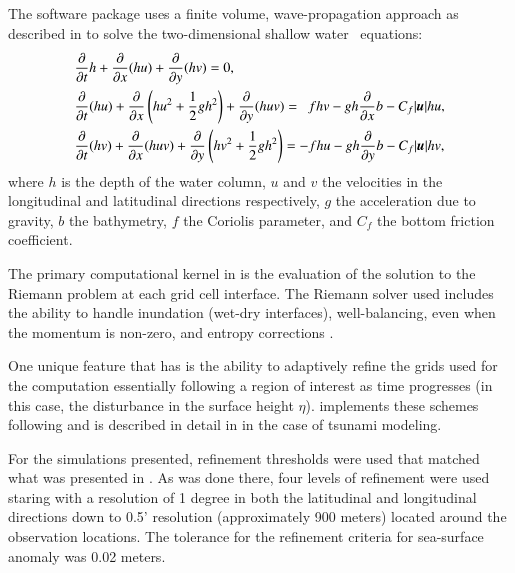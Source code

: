 \subsection{\geoclaw} \label{ssub:geoclaw}
The \geoclaw software package uses a finite volume, wave-propagation approach as
described in \cite{LeVeque:1997eg} to solve the two-dimensional shallow water \
equations:
\begin{equation} \label{eq:swe}
    \begin{aligned}
    &\pd{}{t} h + \pd{}{x} (hu) + \pd{}{y} (hv) = 0, \\
    &\pd{}{t}(hu) + \pd{}{x} \left(hu^2 + \frac{1}{2} g h^2 \right ) + \pd{}{y} (huv) = ~~ fhv - gh \pd{}{x} b - C_f |\vec{u}| hu, \\
    &\pd{}{t} (hv) + \pd{}{x} (huv) + \pd{}{y} \left (hv^2 + \frac{1}{2} gh^2 \right) = -fhu - gh \pd{}{y} b - C_f |\vec{u}| hv,
    \end{aligned}
\end{equation} 
where $h$ is the depth of the water column, $u$ and $v$ the velocities in the 
longitudinal and latitudinal directions respectively, $g$ the acceleration due 
to gravity, $b$ the bathymetry, $f$ the Coriolis parameter, and $C_f$ the bottom 
friction coefficient.  

The primary computational kernel in \geoclaw is the evaluation of the solution
to the Riemann problem at each grid cell interface.  The Riemann solver used
includes the ability to handle inundation (wet-dry interfaces), well-balancing,
even when the momentum is non-zero, \alert{and entropy corrections}
\cite{George:2008aa}.

One unique feature that \geoclaw has is the ability to adaptively refine the
grids used for the computation essentially following a region of interest as
time progresses (in this case, the disturbance in the surface height $\eta$).
\geoclaw implements these schemes following \cite{Berger:1984ui,Berger:1998aa}
and is described in detail in \cite{Berger:2011du} in the case of tsunami
modeling.

For the simulations presented, refinement thresholds were used that matched what
was presented in \cite{MacInnes:2013cr}.  As was done there, four levels of
refinement were used staring with a resolution of 1 degree in both the
latitudinal and longitudinal directions down to 0.5' resolution (approximately
900 meters) located around the observation locations.  The tolerance for the
refinement criteria for sea-surface anomaly was 0.02 meters.

